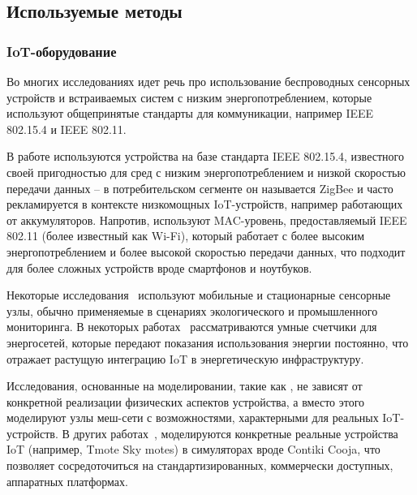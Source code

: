 \documentclass[%
]{report}
\begin{document}

\subsection{Используемые методы}\label{methodology-details}

\subsubsection{IoT-оборудование}\label{iot-hardware}

Во многих исследованиях идет речь про использование
беспроводных сенсорных устройств
и встраиваемых систем с низким энергопотреблением,
которые используют общепринятые стандарты для коммуникации,
например IEEE 802.15.4 и IEEE 802.11.

В работе \textcite{KRENTZ202457}
используются устройства на базе стандарта IEEE 802.15.4,
известного своей пригодностью для
сред с низким энергопотреблением и низкой
скоростью передачи данных -- в потребительском сегменте
он называется ZigBee и часто рекламируется
в контексте низкомощных IoT-устройств,
например работающих от аккумуляторов.
Напротив, \textcite{SAIF2015404,KABIWA20131108}
используют MAC-уровень,
предоставляемый IEEE 802.11 (более известный как Wi-Fi),
который работает с более высоким энергопотреблением
и более высокой скоростью передачи данных,
что подходит для более сложных устройств
вроде смартфонов и ноутбуков.

Некоторые исследования~\cite{SHARMA2013416,VENKATESHA201537}
используют мобильные и стационарные сенсорные узлы,
обычно применяемые в сценариях
экологического и промышленного мониторинга.
В некоторых работах~\cite{HECK2025110364,HASAN2018454}
рассматриваются умные счетчики для энергосетей,
которые передают показания использования энергии
постоянно,
что отражает растущую интеграцию IoT
в энергетическую инфраструктуру.

Исследования, основанные на моделировании,
такие как \textcite{DIIANNI1998131,LI2011458,LIU201321},
не зависят от конкретной реализации физических аспектов
устройства,
а вместо этого моделируют узлы меш-сети
с возможностями,
характерными для реальных IoT-устройств.
В других работах~\cite{CHARLES20201819},
моделируются конкретные
реальные устройства IoT
(например, Tmote Sky motes) в симуляторах вроде Contiki Cooja,
что позволяет сосредоточиться на стандартизированных,
коммерчески доступных, аппаратных платформах.
\end{document}
